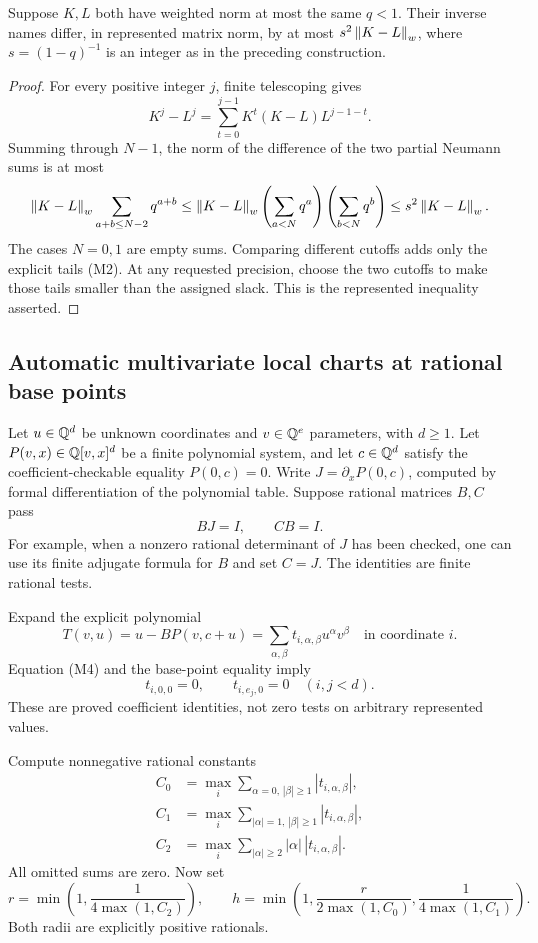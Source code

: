 \begin{proposition}
Suppose \(K,L\) both have weighted norm at most the same \(q<1\).
Their inverse names differ, in represented matrix norm, by at most
\(s^2\left\lVert K-L\right\rVert_w\), where \(s=(1-q)^{-1}\) is an integer
as in the preceding construction.
\end{proposition}
\begin{proof}
For every positive integer \(j\), finite telescoping gives
\[
 K^j-L^j=\sum_{t=0}^{j-1}K^t(K-L)L^{j-1-t}.
\]
Summing through \(N-1\), the norm of the difference of the two
partial Neumann sums is at most
\[
 \left\lVert K-L\right\rVert_w\sum_{a+b\le N-2}q^{a+b}
 \le\left\lVert K-L\right\rVert_w
       \left(\sum_{a<N}q^a\right)
       \left(\sum_{b<N}q^b\right)
 \le s^2\left\lVert K-L\right\rVert_w.
\]
The cases \(N=0,1\) are empty sums. Comparing different cutoffs
adds only the explicit tails (M2). At any requested precision,
choose the two cutoffs to make those tails smaller than the assigned
slack. This is the represented inequality asserted.
\end{proof}

\subsection{Automatic multivariate local charts at rational base points}

Let \(u\in\mathbb Q^d\) be unknown coordinates and \(v\in\mathbb Q^e\)
parameters, with \(d\ge1\). Let \(P(v,x)\in\mathbb Q[v,x]^d\) be
a finite polynomial system, and let \(c\in\mathbb Q^d\) satisfy the
coefficient-checkable equality \(P(0,c)=0\). Write
\(J=\partial_xP(0,c)\), computed by formal differentiation of
the polynomial table. Suppose rational matrices \(B,C\) pass
\[
 BJ=I,\qquad CB=I.                             \tag{M4}
\]
For example, when a nonzero rational determinant of \(J\) has
been checked, one can use its finite adjugate formula for \(B\)
and set \(C=J\). The identities are finite rational tests.

Expand the explicit polynomial
\[
 T(v,u)=u-BP(v,c+u)=
       \sum_{\alpha,\beta}t_{i,\alpha,\beta}u^\alpha v^\beta
       \quad\text{in coordinate }i.           \tag{M5}
\]
Equation (M4) and the base-point equality imply
\[
 t_{i,0,0}=0,\qquad t_{i,e_j,0}=0
 \quad(i,j<d).
\]
These are proved coefficient identities, not zero tests on
arbitrary represented values.

Compute nonnegative rational constants
\begin{align*}
 C_0&=\max_i\sum_{\alpha=0,\,|\beta|\ge1}
                       |t_{i,\alpha,\beta}|,\\
 C_1&=\max_i\sum_{|\alpha|=1,\,|\beta|\ge1}
                       |t_{i,\alpha,\beta}|,\\
 C_2&=\max_i\sum_{|\alpha|\ge2}
                       |\alpha|\,|t_{i,\alpha,\beta}|.
\end{align*}
All omitted sums are zero. Now set
\[
 r=\min\left(1,\frac1{4\max(1,C_2)}\right),
 \qquad
 h=\min\left(1,\frac{r}{2\max(1,C_0)},
                   \frac1{4\max(1,C_1)}\right).
 \label{eq:chart-radii}\tag{M6}
\]
Both radii are explicitly positive rationals.

